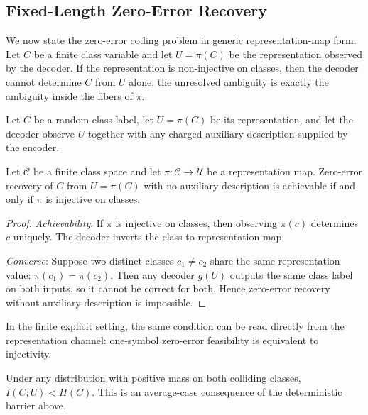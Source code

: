 \subsection{Fixed-Length Zero-Error Recovery}

We now state the zero-error coding problem in generic representation-map form. Let $C$ be a finite class variable and let $U=\pi(C)$ be the representation observed by the decoder. If the representation is non-injective on classes, then the decoder cannot determine $C$ from $U$ alone; the unresolved ambiguity is exactly the ambiguity inside the fibers of $\pi$.

\begin{definition}
Let $C$ be a random class label, let $U=\pi(C)$ be its representation, and let the decoder observe $U$ together with any charged auxiliary description supplied by the encoder.
\end{definition}

\begin{theorem}\label{thm:identification-capacity}
Let $\mathcal{C}$ be a finite class space and let $\pi : \mathcal{C} \to \mathcal{U}$ be a representation map. Zero-error recovery of $C$ from $U=\pi(C)$ with no auxiliary description is achievable if and only if $\pi$ is injective on classes.
\end{theorem}

\begin{proof}
\emph{Achievability}: If $\pi$ is injective on classes, then observing $\pi(c)$ determines $c$ uniquely. The decoder inverts the class-to-representation map.

\emph{Converse}: Suppose two distinct classes $c_1 \neq c_2$ share the same representation value: $\pi(c_1)=\pi(c_2)$. Then any decoder $g(U)$ outputs the same class label on both inputs, so it cannot be correct for both. Hence zero-error recovery without auxiliary description is impossible.
\end{proof}

In the finite explicit setting, the same condition can be read directly from the representation channel: one-symbol zero-error feasibility is equivalent to injectivity. 

\begin{remark}
Under any distribution with positive mass on both colliding classes, $I(C;U) < H(C)$. This is an average-case consequence of the deterministic barrier above.
\end{remark}


